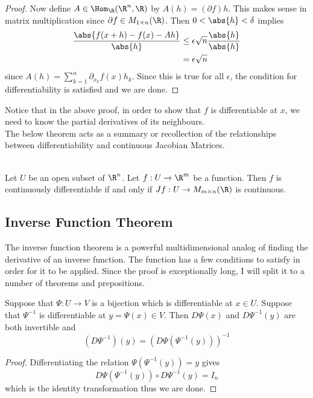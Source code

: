 \documentclass[a4paper]{article}
\begin{document}
\begin{prp}{}{}
\begin{proof}
Now define $A\in\Hom_\R(\R^n,\R)$ by $A(h)=(\partial f)h$. This makes sense in matrix multiplication since $\partial f\in M_{1\times n}(\R)$. Then $0<\abs{h}<\delta$ implies 
\begin{align*}
\frac{\abs{f(x+h)-f(x)-Ah}}{\abs{h}}&\leq\epsilon\sqrt{n}\frac{\abs{h}}{\abs{h}}\\
&=\epsilon\sqrt{n}
\end{align*} since $A(h)=\sum_{k=1}^n\partial_{x_k}f(x)h_k$. Since this is true for all $\epsilon$, the condition for differentiability is satisfied and we are done. 
\end{proof}
\end{prp}

Notice that in the above proof, in order to show that $f$ is differentiable at $x$, we need to know the partial derivatives of its neighbours. \\

The below theorem acts as a summary or recollection of the relationships between differentiability and continuous Jacobian Matrices. 

\begin{crl}{}{}\\
Let $U$ be an open subset of $\R^n$. Let $f:U\to\R^m$ be a function. Then $f$ is continuously differentiable if and only if $Jf:U\to M_{m\times n}(\R)$ is continuous. 
\end{crl}

\subsection{Inverse Function Theorem}
The inverse function theorem is a powerful multidimensional analog of finding the derivative of an inverse function. The function has a few conditions to satisfy in order for it to be applied. Since the proof is exceptionally long, I will split it to a number of theorems and prepositions. 
\begin{prp}{}{} Suppose that $\Psi:U\to V$ is a bijection which is differentiable at $x\in U$. Suppose that $\Psi^{-1}$ is differentiable at $y=\Psi(x)\in V$. Then $D\Psi(x)$ and $D\Psi^{-1}(y)$ are both invertible and $$(D\Psi^{-1})(y)=(D\Psi(\Psi^{-1}(y)))^{-1}$$ 
\begin{proof}
Differentiating the relation $\Psi(\Psi^{-1}(y))=y$ gives $$D\Psi(\Psi^{-1}(y))\circ D\Psi^{-1}(y)=I_n$$ which is the identity transformation thus we are done. 
\end{proof}
\end{prp}
\end{document}
